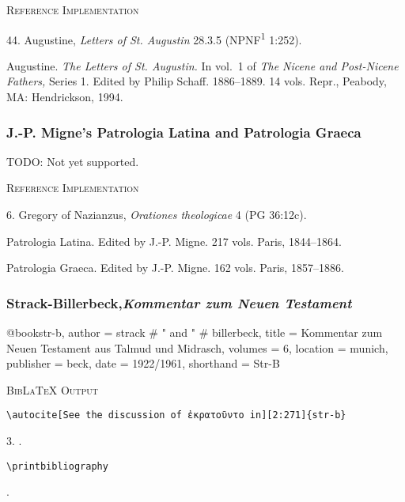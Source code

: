 \documentclass[a4paper]{article}
\newcommand{\gr}[1]{{\greekfont #1}}
\newenvironment{refimp}{%
  \begin{minipage}{\linewidth}
    \setlength{\parskip}{1ex}
    \textsc{Reference Implementation}\par
    \nobreak
    \color{reference-colour}
}{\end{minipage}}
\newenvironment{vb}{%
  \setlength{\parskip}{0pt}
  \verbatim}{\endverbatim}
\begin{document}
\begin{refimp}
  44. Augustine, \emph{Letters of St. Augustin} 28.3.5
  (NPNF\textsuperscript{1} 1:252).
  
  \hangindent\bibindent Augustine. \emph{The Letters of St. Augustin.} In
  vol.~1 of \emph{The Nicene and Post-Nicene Fathers,} Series 1. Edited by
  Philip Schaff. 1886–1889. 14 vols. Repr., Peabody, MA: Hendrickson, 1994.
\end{refimp}

\subsubsection{J.-P. Migne's Patrologia Latina and Patrologia Graeca}

TODO: Not yet supported.

\begin{refimp}
  6. Gregory of Nazianzus, \emph{Orationes theologicae} 4 (PG 36:12c).

  \hangindent\bibindent Patrologia Latina. Edited by J.-P. Migne. 217 vols.
  Paris, 1844–1864.

  \hangindent\bibindent Patrologia Graeca. Edited by J.-P. Migne. 162 vols.
  Paris, 1857–1886.
\end{refimp}

\subsubsection{Strack-Billerbeck,\newline\emph{Kommentar zum Neuen Testament}}

\begin{vb}
@book{str-b,
  author = strack # " and " # billerbeck,
  title = {Kommentar zum Neuen Testament aus Talmud und Midrasch},
  volumes = {6},
  location = munich,
  publisher = beck,
  date = {1922/1961},
  shorthand = {Str-B}
}
\end{vb}

{\textsc{BibLaTeX Output}\par
   \nobreak
   \texttt{\textbackslash autocite[See the discussion of ἐκρατοῦντο in][2:271]\{str-b\}}\par
   \color{biblatex-colour}
   3. \cite[See the discussion of \gr{ἐκρατοῦντο} in][2:271]{str-b}.\par
   \color{black}
   \texttt{\textbackslash printbibliography}\par
   \color{biblatex-colour}
   \hangindent\bibindent{}.\par}
\end{document}
